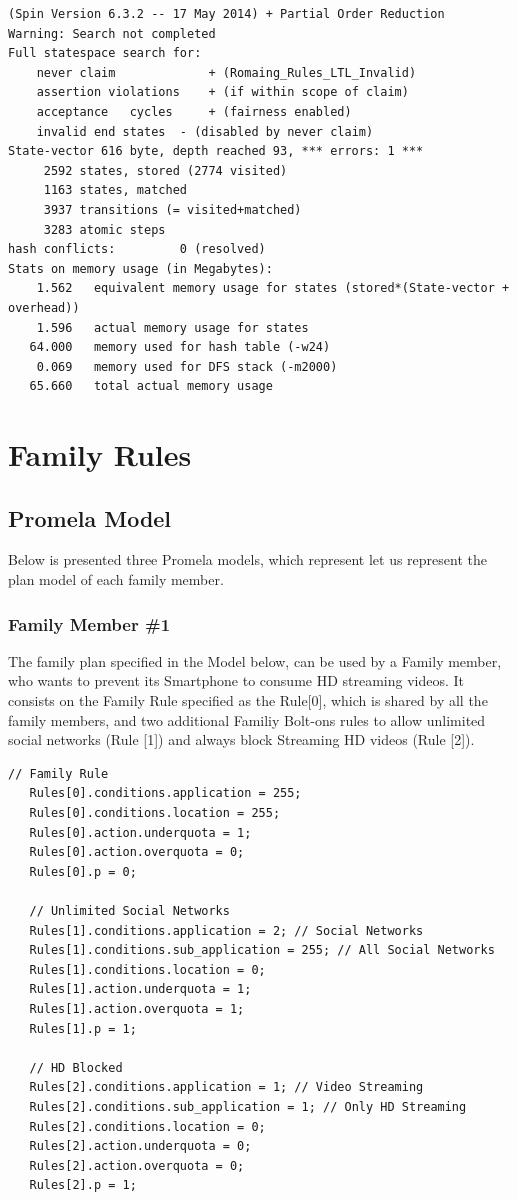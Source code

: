 \singlespacing
\begin{lstlisting}[caption=Invalid Roaming-Rules Plan - Verification II,
  label=InvalidRoamingResult2]
(Spin Version 6.3.2 -- 17 May 2014) + Partial Order Reduction
Warning: Search not completed
Full statespace search for:
	never claim         	+ (Romaing_Rules_LTL_Invalid)
	assertion violations	+ (if within scope of claim)
	acceptance   cycles 	+ (fairness enabled)
	invalid end states	- (disabled by never claim)
State-vector 616 byte, depth reached 93, *** errors: 1 ***
     2592 states, stored (2774 visited)
     1163 states, matched
     3937 transitions (= visited+matched)
     3283 atomic steps
hash conflicts:         0 (resolved)
Stats on memory usage (in Megabytes):
    1.562	equivalent memory usage for states (stored*(State-vector + overhead))
    1.596	actual memory usage for states
   64.000	memory used for hash table (-w24)
    0.069	memory used for DFS stack (-m2000)
   65.660	total actual memory usage
\end{lstlisting}
\doublespacing

\section{Family Rules}
\subsection{Promela Model}
\noindent
Below is presented three Promela models, which represent let us represent the plan model of each family member.   

\subsubsection{Family Member \#1}
\noindent
The family plan specified in the Model below, can be used by a Family member, who wants to prevent its Smartphone to consume HD streaming videos. It consists on the Family Rule specified as the Rule[0], which is shared by all the family members, and two additional Familiy Bolt-ons rules to allow unlimited social networks (Rule [1]) and always block Streaming HD videos (Rule [2]). \\

\singlespacing
\begin{lstlisting}[caption=Family Member\#1 Model,
  label=FamilyP1_Listing]
   // Family Rule
   Rules[0].conditions.application = 255;
   Rules[0].conditions.location = 255;
   Rules[0].action.underquota = 1;
   Rules[0].action.overquota = 0;
   Rules[0].p = 0;

   // Unlimited Social Networks
   Rules[1].conditions.application = 2; // Social Networks
   Rules[1].conditions.sub_application = 255; // All Social Networks
   Rules[1].conditions.location = 0;
   Rules[1].action.underquota = 1;
   Rules[1].action.overquota = 1;
   Rules[1].p = 1;

   // HD Blocked
   Rules[2].conditions.application = 1; // Video Streaming
   Rules[2].conditions.sub_application = 1; // Only HD Streaming
   Rules[2].conditions.location = 0;
   Rules[2].action.underquota = 0;
   Rules[2].action.overquota = 0;
   Rules[2].p = 1;
\end{lstlisting}
\doublespacing

